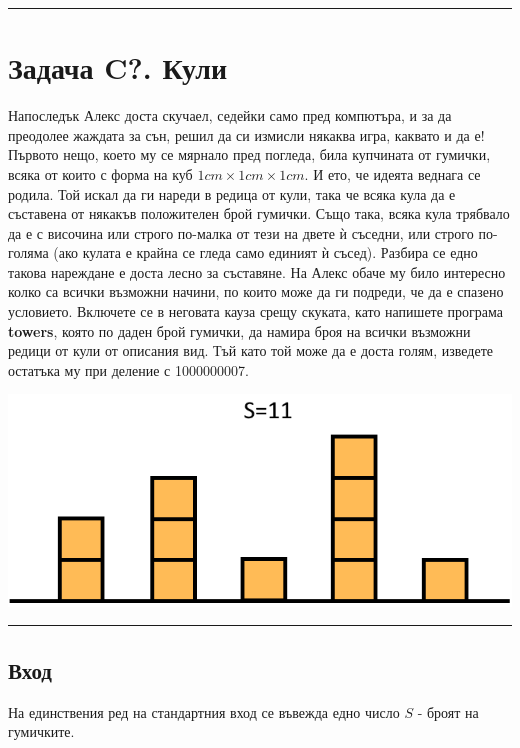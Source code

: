 \documentclass[12pt]{article}
\begin{document}
\noindent\textcolor{cyan}{\rule{10cm}{1.5mm}}
\section*{\hspace{0.61cm}Задача C?. Кули}


Напоследък Алекс доста скучаел, седейки само пред компютъра, и за да преодолее жаждата за сън, решил да си измисли някаква игра, каквато и да е! Първото нещо, което му се мярнало пред погледа, била купчината от гумички, всяка от които с форма на куб $1cm\times1cm\times1cm$. И ето, че идеята веднага се родила. Той искал да ги нареди в редица от кули, така че всяка кула да е съставена от някакъв положителен брой гумички. Също така, всяка кула трябвало да е с височина или строго по-малка от тези на двете ѝ съседни, или строго по-голяма (ако кулата е крайна се гледа само единият ѝ съсед). Разбира се едно такова нареждане е доста лесно за съставяне. На Алекс обаче му било интересно колко са всички възможни начини, по които може да ги подреди, че да е спазено условието. Включете се в неговата кауза срещу скуката, като напишете програма \textbf{towers}, която по даден брой гумички, да намира броя на всички възможни редици от кули от описания вид. Тъй като той може да е доста голям, изведете остатъка му при деление с 1000000007.

\begin{center}
\includegraphics[scale=0.7]{towers_example_1}
\end{center}

\noindent\textcolor{cyan}{\rule{8cm}{1.0mm}}
\subsection*{\hspace{0.61cm}Вход}
На единствения ред на стандартния вход се въвежда едно число $S$ - броят на гумичките.
\end{document}
